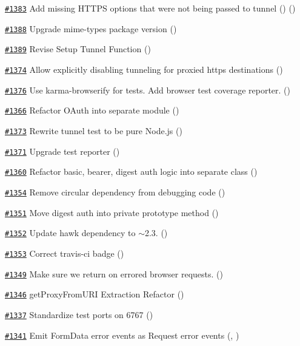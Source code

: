 \begin{DoxyItemize}
\item \href{https://github.com/request/request/pull/1383}{\tt \#1383} Add missing H\+T\+T\+PS options that were not being passed to tunnel () ()
\item \href{https://github.com/request/request/pull/1388}{\tt \#1388} Upgrade mime-\/types package version ()
\item \href{https://github.com/request/request/pull/1389}{\tt \#1389} Revise Setup Tunnel Function ()
\item \href{https://github.com/request/request/pull/1374}{\tt \#1374} Allow explicitly disabling tunneling for proxied https destinations ()
\item \href{https://github.com/request/request/pull/1376}{\tt \#1376} Use karma-\/browserify for tests. Add browser test coverage reporter. ()
\item \href{https://github.com/request/request/pull/1366}{\tt \#1366} Refactor O\+Auth into separate module ()
\item \href{https://github.com/request/request/pull/1373}{\tt \#1373} Rewrite tunnel test to be pure Node.\+js ()
\item \href{https://github.com/request/request/pull/1371}{\tt \#1371} Upgrade test reporter ()
\item \href{https://github.com/request/request/pull/1360}{\tt \#1360} Refactor basic, bearer, digest auth logic into separate class ()
\item \href{https://github.com/request/request/pull/1354}{\tt \#1354} Remove circular dependency from debugging code ()
\item \href{https://github.com/request/request/pull/1351}{\tt \#1351} Move digest auth into private prototype method ()
\item \href{https://github.com/request/request/pull/1352}{\tt \#1352} Update hawk dependency to $\sim$2.3. ()
\item \href{https://github.com/request/request/pull/1353}{\tt \#1353} Correct travis-\/ci badge ()
\item \href{https://github.com/request/request/pull/1349}{\tt \#1349} Make sure we return on errored browser requests. ()
\item \href{https://github.com/request/request/pull/1346}{\tt \#1346} get\+Proxy\+From\+U\+RI Extraction Refactor ()
\item \href{https://github.com/request/request/pull/1337}{\tt \#1337} Standardize test ports on 6767 ()
\item \href{https://github.com/request/request/pull/1341}{\tt \#1341} Emit Form\+Data error events as Request error events (, )

\end{DoxyItemize}
